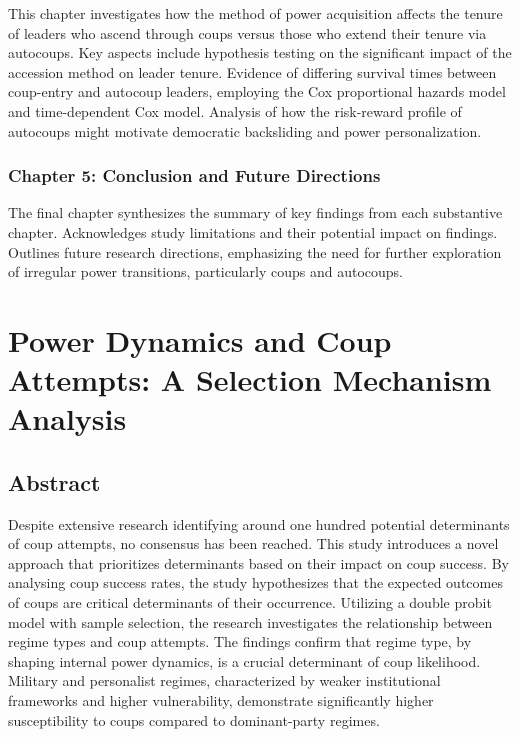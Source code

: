 \documentclass[
  12pt,
]{report}
\begin{document}
This chapter investigates how the method of power acquisition affects
the tenure of leaders who ascend through coups versus those who extend
their tenure via autocoups. Key aspects include hypothesis testing on
the significant impact of the accession method on leader tenure.
Evidence of differing survival times between coup-entry and autocoup
leaders, employing the Cox proportional hazards model and time-dependent
Cox model. Analysis of how the risk-reward profile of autocoups might
motivate democratic backsliding and power personalization.

\subsection{Chapter 5: Conclusion and Future
Directions}\label{chapter-5-conclusion-and-future-directions}

The final chapter synthesizes the summary of key findings from each
substantive chapter. Acknowledges study limitations and their potential
impact on findings. Outlines future research directions, emphasizing the
need for further exploration of irregular power transitions,
particularly coups and autocoups.

\chapter{Power Dynamics and Coup Attempts: A Selection Mechanism
Analysis}\label{sec-chapter2}

\section*{Abstract}\label{abstract-1}

Despite extensive research identifying around one hundred potential
determinants of coup attempts, no consensus has been reached. This study
introduces a novel approach that prioritizes determinants based on their
impact on coup success. By analysing coup success rates, the study
hypothesizes that the expected outcomes of coups are critical
determinants of their occurrence. Utilizing a double probit model with
sample selection, the research investigates the relationship between
regime types and coup attempts. The findings confirm that regime type,
by shaping internal power dynamics, is a crucial determinant of coup
likelihood. Military and personalist regimes, characterized by weaker
institutional frameworks and higher vulnerability, demonstrate
significantly higher susceptibility to coups compared to dominant-party
regimes.
\end{document}
